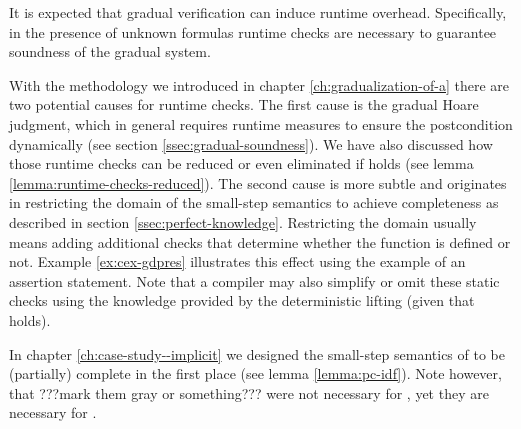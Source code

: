 It is expected that gradual verification can induce runtime overhead.
Specifically, in the presence of unknown formulas runtime checks are necessary to guarantee soundness of the gradual system.

With the methodology we introduced in chapter \ref{ch:gradualization-of-a} there are two potential causes for runtime checks.
The first cause is the gradual Hoare judgment, which in general requires runtime measures to ensure the postcondition dynamically (see section \ref{ssec:gradual-soundness}).
We have also discussed how those runtime checks can be reduced or even eliminated if  holds (see lemma \ref{lemma:runtime-checks-reduced}).
The second cause is more subtle and originates in restricting the domain of the small-step semantics to achieve completeness as described in section \ref{ssec:perfect-knowledge}.
Restricting the domain usually means adding additional checks that determine whether the function is defined or not.
Example \ref{ex:cex-gdpres} illustrates this effect using the example of an assertion statement.
Note that a compiler may also simplify or omit these static checks using the knowledge provided by the deterministic lifting (given that   holds).

In chapter \ref{ch:case-study--implicit} we designed the small-step semantics of \svlidf to be (partially) complete in the first place (see lemma \ref{lemma:pc-idf}).
Note however, that ???mark them gray or something??? were not necessary for \svlidf, yet they are necessary for \gvlidf.

